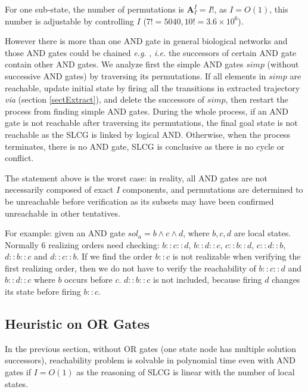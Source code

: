 \documentclass[runningheads]{llncs}
\begin{document}
For one sub-state, the number of permutations is $\mathbf{A}_I^I=I!$, as $I=O (1)$, this number is adjustable by controlling $I$ ($7!=5040,10!=3.6\times 10^6$).

However there is more than one AND gate in general biological networks and those AND gates could be chained \textit{e.g.} \cite{samaga2009logic}, \textit{i.e.} the successors of certain AND gate contain other AND gates. We analyze first the simple AND gates $simp$ (without successive AND gates) by traversing its permutations. If all elements in $simp$ are reachable, update initial state by firing all the transitions in extracted trajectory \textit{via} (section \ref{sectExtract}), and delete the successors of $simp$, then restart the process from finding simple AND gates. During the whole process, if an AND gate is not reachable after traversing its permutations, the final goal state is not reachable as the SLCG is linked by logical AND. Otherwise, when the process terminates, there is no AND gate, SLCG is conclusive as there is no cycle or conflict.

The statement above is the worst case: in reality, all AND gates are not necessarily composed of exact $I$ components, and permutations are determined to be unreachable before verification as its subsets may have been confirmed unreachable in other tentatives.

For example: given an AND gate $sol_a=b\land c\land d$, where $b,c,d$ are local states. Normally 6 realizing orders need checking: $b::c::d$, $b::d::c$, $c::b::d$, $c::d::b$, $d::b::c$ and $d::c::b$. If we find the order $b::c$ is not realizable when verifying the first realizing order, then we do not have to verify the reachability of $b::c::d$ and $b::d::c$ where $b$ occurs before $c$. $d::b::c$ is not included, because firing $d$ changes its state before firing $b::c$.



\subsection{Heuristic on OR Gates}\label{sectheuristic}
In the previous section, without OR gates (one state node has multiple solution successors), reachability problem is solvable in polynomial time even with AND gates if $I=O (1)$ as the reasoning of SLCG is linear with the number of local states.
\end{document}
